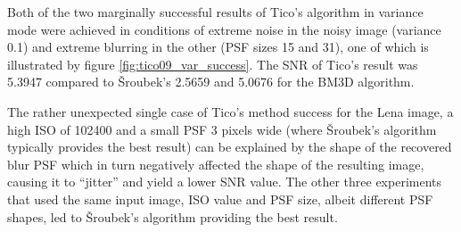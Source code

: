 \documentclass[12pt,notitlepage]{report}
\begin{document}
Both of the two marginally successful results of Tico's algorithm in variance mode were achieved in conditions of extreme noise in the noisy image (variance 0.1) and extreme blurring in the other (PSF sizes 15 and 31), one of which is illustrated by figure \ref{fig:tico09_var_success}. The SNR of Tico's result was 5.3947 compared to Šroubek's 2.5659 and 5.0676 for the BM3D algorithm.

The rather unexpected single case of Tico's method success for the Lena image, a high ISO of 102400 and a small PSF 3 pixels wide (where Šroubek's algorithm typically provides the best result) can be explained by the shape of the recovered blur PSF which in turn negatively affected the shape of the resulting image, causing it to ``jitter'' and yield a lower SNR value. The other three experiments that used the same input image, ISO value and PSF size, albeit different PSF shapes, led to Šroubek's algorithm providing the best result.   

\clearpage
\end{document}

